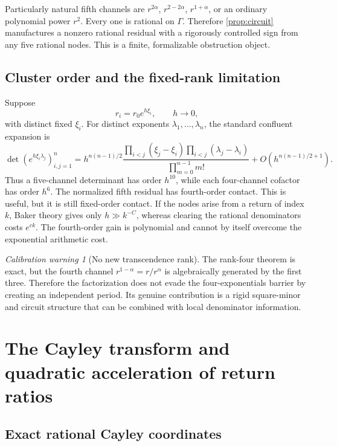 \documentclass[11pt]{article}
\theoremstyle{definition}
\theoremstyle{remark}
\newtheorem{warning}[theorem]{Calibration warning}
\begin{document}
Particularly natural fifth channels are $r^{2\alpha}$, $r^{2-2\alpha}$, $r^{1+\alpha}$, or an ordinary polynomial power $r^2$.  Every one is rational on $\Gamma$.  Therefore \cref{prop:circuit} manufactures a nonzero rational residual with a rigorously controlled sign from any five rational nodes.  This is a finite, formalizable obstruction object.

\subsection{Cluster order and the fixed-rank limitation}

Suppose
\[
 r_i=r_0e^{h\xi_i},\qquad h\to0,
\]
with distinct fixed $\xi_i$.  For distinct exponents $\lambda_1,\dots,\lambda_n$, the standard confluent expansion is
\begin{equation}\label{eq:exp-vandermonde-asymptotic}
 \det(e^{h\xi_i\lambda_j})_{i,j=1}^n
 =h^{n(n-1)/2}
 \frac{\prod_{i<j}(\xi_j-\xi_i)\prod_{i<j}(\lambda_j-\lambda_i)}
 {\prod_{m=0}^{n-1}m!}
 +O\!\left(h^{n(n-1)/2+1}\right).
\end{equation}
Thus a five-channel determinant has order $h^{10}$, while each four-channel cofactor has order $h^6$.  The normalized fifth residual has fourth-order contact.  This is useful, but it is still fixed-order contact.  If the nodes arise from a return of index $k$, Baker theory gives only $h\gg k^{-C}$, whereas clearing the rational denominators costs $e^{ck}$.  The fourth-order gain is polynomial and cannot by itself overcome the exponential arithmetic cost.

\begin{warning}[No new transcendence rank]
The rank-four theorem is exact, but the fourth channel $r^{1-\alpha}=r/r^\alpha$ is algebraically generated by the first three.  Therefore the factorization does not evade the four-exponentials barrier by creating an independent period.  Its genuine contribution is a rigid square-minor and circuit structure that can be combined with local denominator information.
\end{warning}

\section{The Cayley transform and quadratic acceleration of return ratios}
\label{sec:cayley}

\subsection{Exact rational Cayley coordinates}
\end{document}
